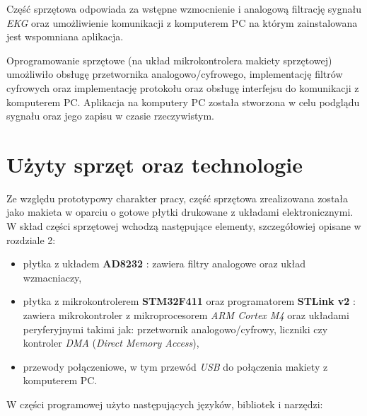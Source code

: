 Część sprzętowa odpowiada za wstępne wzmocnienie i analogową filtrację sygnału \textit{EKG} 
oraz umożliwienie komunikacji z komputerem PC na którym zainstalowana jest wspomniana aplikacja. 


Oprogramowanie sprzętowe (na układ mikrokontrolera makiety sprzętowej) umożliwiło obsługę przetwornika analogowo/cyfrowego,
implementację filtrów cyfrowych oraz implementację protokołu oraz obsługę interfejsu do komunikacji z komputerem PC.
Aplikacja na komputery PC została stworzona w celu podglądu sygnału oraz jego zapisu w czasie rzeczywistym.

\newpage

\section*{Użyty sprzęt oraz technologie}

Ze względu prototypowy charakter pracy, część sprzętowa zrealizowana została jako makieta w oparciu o gotowe
płytki drukowane z układami elektronicznymi. W skład części sprzętowej wchodzą następujące elementy, szczegółowiej
opisane w rozdziale 2:

\begin{itemize}

    \item płytka z układem \textbf{AD8232} \cite{AD8232BS} \cite{AD8232ds}: zawiera filtry analogowe oraz układ wzmacniaczy,


    \item płytka z mikrokontrolerem \textbf{STM32F411} oraz programatorem \textbf{STLink v2} \cite{STM32F4DS} \cite{NUCLEO}: 
    zawiera mikrokontroler z mikroprocesorem \textit{ARM Cortex M4} oraz układami peryferyjnymi takimi jak: 
    przetwornik analogowo/cyfrowy, liczniki czy kontroler \textit{DMA} (\textit{Direct Memory Access}),
    

    \item przewody połączeniowe, w tym przewód \textit{USB} do połączenia makiety z komputerem PC.


\end{itemize}

W części programowej użyto następujących języków, bibliotek i narzędzi:

